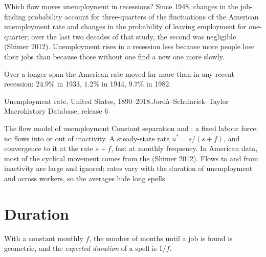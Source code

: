 Which flow moves unemployment in recessions? Since 1948, changes in the
job-finding probability account for three-quarters of the fluctuations of
the American unemployment rate and changes in the probability of leaving
employment for one-quarter; over the last two decades of that study, the
second was negligible (Shimer 2012). %
Unemployment rises in a recession less because more people lose their jobs
than because those without one find a new one more slowly.

Over a longer span the American rate moved far more than in any recent
recession: $24.9\%$ in 1933, $1.2\%$ in 1944, $9.7\%$ in 1982. %

\begin{omchart}{Unemployment rate, United States, 1890--2018.}{Jord\`a--Schularick--Taylor
Macrohistory Database, release 6}
\end{omchart}

\begin{model}{The flow model of unemployment}
\assumes Constant separation and ; a fixed labour force;
no flows into or out of inactivity.
\predicts A steady-state rate $u^* = s/(s + f)$, and convergence to it at the rate
$s + f$, fast at monthly frequency.
\tested In American data, most of the cyclical movement comes from the
 (Shimer 2012). %
\breaks Flows to and from inactivity are large and ignored; rates vary with
the duration of unemployment and across workers, so the averages hide
long spells.
\end{model}

\section{Duration}\label{sec:b1:unemployment-flows:duration}

\begin{definition}\label{def:b1:unemployment-flows:duration}
With a constant monthly  $f$, the number of months until a
job is found is geometric, and the \emph{expected duration} of a spell is $1/f$.
\end{definition}

